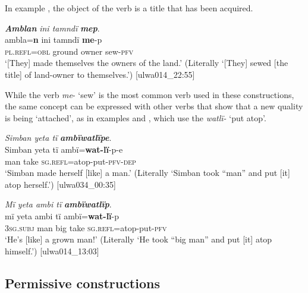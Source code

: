\newpage

In example , the object of the verb is a title that has been acquired.

\ea%
    \label{ex:syntax:365}
          \textbf{\textit{Amblan}} \textit{ini tamndï} \textbf{\textit{mep}}.\\
\gll ambla=\textbf{n}    ini    tamndï  \textbf{me}{}-p\\
    \textsc{pl.refl=obl}  ground  owner  sew-\textsc{pfv}\\
\glt `[They] made themselves the owners of the land.’ (Literally ‘[They] sewed [the title] of land-owner to themselves.’) [ulwa014\_22:55]
\z

While the verb \textit{me}{}- ‘sew’ is the most common verb used in these constructions, the same  concept can be expressed with other verbs that show that a new quality is being ‘attached’, as in examples  and , which use the  \textit{watlï-} ‘put atop’.


\ea%
    \label{ex:syntax:366}
          \textit{Simban yeta tï} \textbf{\textit{ambïwatlïpe}}.\\
\gll Simban  yeta  tï    ambï=\textbf{wat-lï}{}-p-e\\
    [name]    man  take  \textsc{sg.refl=}atop-put-\textsc{pfv-dep}\\
\glt `Simban made herself [like] a man.’ (Literally ‘Simban took “man” and put [it] atop herself.’) [ulwa034\_00:35]
\z

\ea%
    \label{ex:syntax:367}
          \textit{Mï yeta ambi tï} \textbf{\textit{ambïwatlïp}}.\\
\gll mï      yeta  ambi  tï    ambï=\textbf{wat-lï}{}-p\\
    \textsc{3sg.subj}  man  big    take  \textsc{sg.refl}=atop-put-\textsc{pfv}\\
\glt `He’s [like] a grown man!’ (Literally ‘He took “big man” and put [it] atop himself.’) [ulwa014\_13:03]
\z

\subsection{Permissive constructions}\label{sec:13.9.4}


